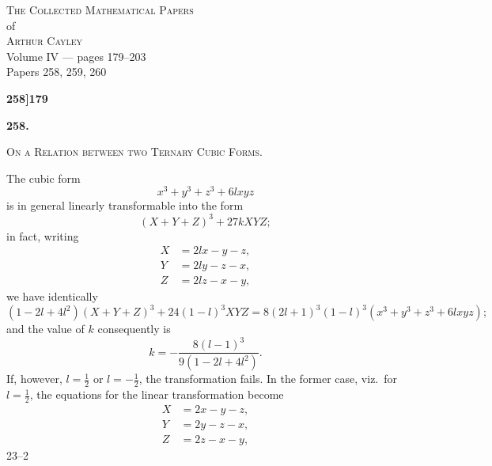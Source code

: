 \documentclass[11pt]{article}
\begin{document}
\thispagestyle{empty}
\begin{center}
\vspace*{2cm}
{\Large\scshape The Collected Mathematical Papers}\\[0.4em]
{\large of}\\[0.4em]
{\Large\scshape Arthur Cayley}\\[1.5em]
{\large Volume IV --- pages 179--203}\\[0.6em]
{\normalsize Papers 258, 259, 260}\\[2em]
\vfill
\end{center}
\newpage

\setcounter{page}{179}


\noindent\textbf{258]}\hfill\textbf{179}

\bigskip

\begin{center}
{\large\bfseries 258.}

\medskip

{\scshape On a Relation between two Ternary Cubic Forms.}
\end{center}

\medskip


\bigskip

\noindent The cubic form
\[
x^3 + y^3 + z^3 + 6lxyz
\]
is in general linearly transformable into the form
\[
(X + Y + Z)^3 + 27kXYZ;
\]
in fact, writing
\[
\begin{aligned}
X &= 2lx - y - z,\\
Y &= 2ly - z - x,\\
Z &= 2lz - x - y,
\end{aligned}
\]
we have identically
\[
(1 - 2l + 4l^2)(X + Y + Z)^3 + 24(1 - l)^3 XYZ = 8(2l + 1)^3 (1 - l)^3 (x^3 + y^3 + z^3 + 6lxyz);
\]
and the value of $k$ consequently is
\[
k = -\frac{8(l-1)^3}{9(1 - 2l + 4l^2)}.
\]
If, however, $l = \tfrac{1}{2}$ or $l = -\tfrac{1}{2}$, the transformation fails. In the former case, viz.\ for $l = \tfrac{1}{2}$, the equations for the linear transformation become
\[
\begin{aligned}
X &= 2x - y - z,\\
Y &= 2y - z - x,\\
Z &= 2z - x - y,
\end{aligned}
\]
\hfill 23--2
\end{document}
